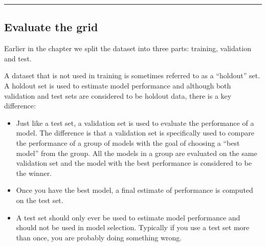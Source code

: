 \documentclass[
]{book}
\newenvironment{Shaded}{\begin{snugshade}}{\end{snugshade}}
\newcommand{\CommentTok}[1]{\textcolor[rgb]{0.56,0.35,0.01}{\textit{#1}}}
\newcommand{\ControlFlowTok}[1]{\textcolor[rgb]{0.13,0.29,0.53}{\textbf{#1}}}
\newcommand{\DataTypeTok}[1]{\textcolor[rgb]{0.13,0.29,0.53}{#1}}
\newcommand{\DecValTok}[1]{\textcolor[rgb]{0.00,0.00,0.81}{#1}}
\newcommand{\KeywordTok}[1]{\textcolor[rgb]{0.13,0.29,0.53}{\textbf{#1}}}
\newcommand{\NormalTok}[1]{#1}
\newcommand{\OperatorTok}[1]{\textcolor[rgb]{0.81,0.36,0.00}{\textbf{#1}}}
\newcommand{\StringTok}[1]{\textcolor[rgb]{0.31,0.60,0.02}{#1}}
\begin{document}
\begin{Shaded}
\end{Shaded}

\begin{center}\rule{0.5\linewidth}{0.5pt}\end{center}

\hypertarget{evaluate-the-grid}{%
\subsection{Evaluate the grid}\label{evaluate-the-grid}}

Earlier in the chapter we split the dataset into three parts: training, validation and test.

A dataset that is not used in training is sometimes referred to as a ``holdout'' set. A holdout set is used to estimate model performance and although both validation and test sets are considered to be holdout data, there is a key difference:

\begin{itemize}
\item
  Just like a test set, a validation set is used to evaluate the performance of a model. The difference is that a validation set is specifically used to compare the performance of a group of models with the goal of choosing a ``best model'' from the group. All the models in a group are evaluated on the same validation set and the model with the best performance is considered to be the winner.
\item
  Once you have the best model, a final estimate of performance is computed on the test set.
\item
  A test set should only ever be used to estimate model performance and should not be used in model selection. Typically if you use a test set more than once, you are probably doing something wrong.
\end{itemize}
\end{document}
